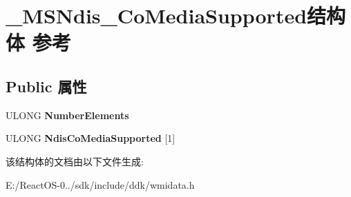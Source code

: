 \hypertarget{struct___m_s_ndis___co_media_supported}{}\section{\+\_\+\+M\+S\+Ndis\+\_\+\+Co\+Media\+Supported结构体 参考}
\label{struct___m_s_ndis___co_media_supported}
\subsection*{Public 属性}
\begin{DoxyCompactItemize}
\item 
\mbox{\label{struct___m_s_ndis___co_media_supported_ab8303468725f0249c36bdbd1aa2230eb}} 
U\+L\+O\+NG {\bfseries Number\+Elements}
\item 
\mbox{\label{struct___m_s_ndis___co_media_supported_a53c5be6c02cec78eda3b1e0df7955529}} 
U\+L\+O\+NG {\bfseries Ndis\+Co\+Media\+Supported} \mbox{[}1\mbox{]}
\end{DoxyCompactItemize}


该结构体的文档由以下文件生成\+:\begin{DoxyCompactItemize}
\item 
E\+:/\+React\+O\+S-\/0../sdk/include/ddk/wmidata.\+h\end{DoxyCompactItemize}
